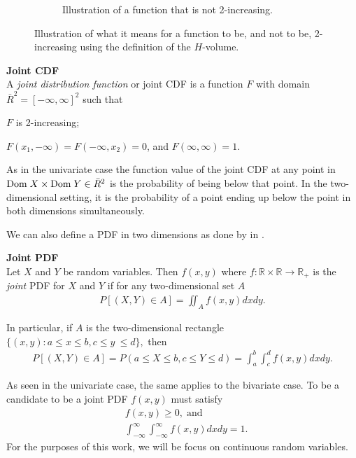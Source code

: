 \begin{figure}[h]
\begin{subfigure}[t]{0.45\linewidth}
        \caption{Illustration of a function that is not 2-increasing.}
    \end{subfigure}
    \caption{Illustration of what it means for a function to be, and not to be, 2-increasing using the definition of the $H$-volume.}
    \label{fig:2-Increasing}
\end{figure}


\begin{definition}\label{def:JointCDF} \textbf{Joint CDF} \\
    A \emph{joint distribution function} or joint \gls{CDF} is a function $F$ with domain $\bar{R}^2 = [-\infty, \infty]^2$ such that 
    \begin{compactenum}
        \item $F$ is 2-increasing; 
        \item $F(x_1,-\infty)= F(-\infty, x_2) = 0$, and $F(\infty,\infty)=1$.
    \end{compactenum}
\end{definition}

As in the univariate case the function value of the joint \gls{CDF} at any point in $\mathrm{Dom \;} X\times \mathrm{Dom \;} Y \in\bar{R}^2$ is the probability of being below that point. In the two-dimensional setting, it is the probability of a point ending up below the point in both dimensions simultaneously. 

We can also define a \gls{PDF} in two dimensions as done by  in .

\begin{definition}\label{def:JointPDF} \textbf{Joint PDF}\\
    Let $X$ and $Y$ be random variables. Then $f(x,y)$ where $f:\mathbb{R}\times\mathbb{R}\to \mathbb{R}_+$ is the \emph{joint} \gls{PDF} for $X$ and $Y$ if for any two-dimensional set $A$ 
    \begin{align*}
        P[(X,Y) \in A] =  \iint_A f(x,y)dxdy.
    \end{align*}
    
    In particular, if $A$ is the two-dimensional rectangle $\{(x,y) : a\leq x \leq b, c\leq y \ \leq d\}, $ then
    \begin{align*}
        P[(X,Y) \in A] = P(a\leq X \leq b, c \leq Y \leq d) =\int_a^b\!\!\!\int_c^d f(x,y)dxdy.
    \end{align*}
\end{definition}

\begin{remark}
    As seen in the univariate case, the same applies to the bivariate case. To be a candidate to be a joint \gls{PDF} $f(x,y)$ must satisfy 
    \begin{align*}
        &f(x,y) \geq 0, \;\mathrm{and} \\
        &\int_{-\infty}^{\infty}\!\int_{-\infty}^{\infty}f(x,y)dxdy=1.
    \end{align*}
    For the purposes of this work, we will be focus on continuous random variables.
\end{remark}


